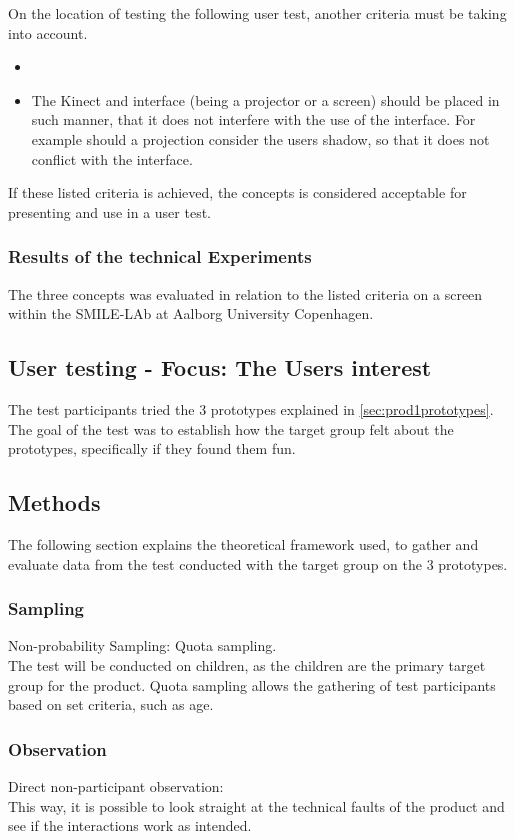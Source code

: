 On the location of testing the following user test, another criteria must be taking into account. 
\begin{itemize}
    \item 
 \item The Kinect and interface (being a projector or a screen) should be placed in such manner, that it does not interfere with the use of the interface. For example should a projection consider the users shadow, so that it does not conflict with the interface. \\ 
\end{itemize}

If these listed criteria is achieved, the concepts is considered acceptable for presenting and use in a user test. 

\subsubsection{Results of the technical Experiments} 
The three concepts was evaluated in relation to the listed criteria on a screen within the SMILE-LAb at Aalborg University Copenhagen. 


\subsection{User testing - Focus: The Users interest}

The test participants tried the 3 prototypes explained in \autoref{sec:prod1prototypes}. The goal of the test was to establish how the target group felt about the prototypes, specifically if they found them fun. 

\subsection{Methods}
The following section explains the theoretical framework used, to gather and evaluate data from the test conducted with the target group on the 3 prototypes.   
\subsubsection{Sampling}
Non-probability Sampling: Quota sampling.\\
The test will be conducted on children, as the children are the primary target group for the product. Quota sampling allows the gathering of test participants based on set criteria, such as age. \cite{bjoernerBog}

\subsubsection{Observation}
Direct non-participant observation:\\
This way, it is possible to look straight at the technical faults of the product and see if the interactions work as intended.\cite{bjoernerBog}

